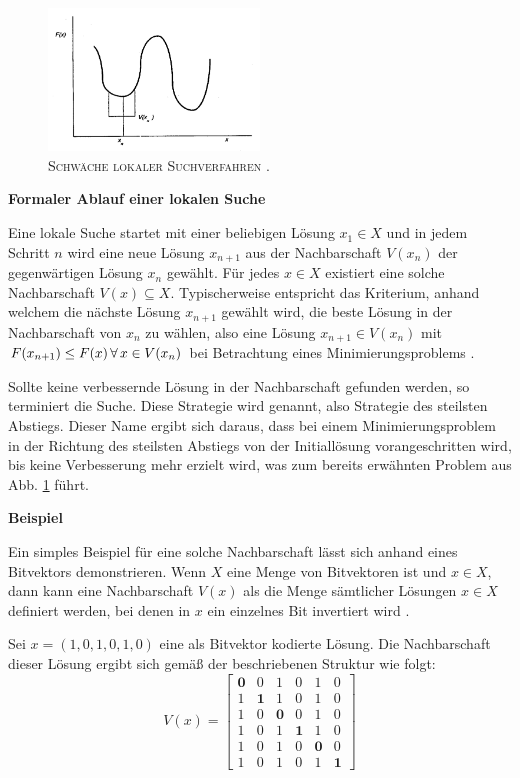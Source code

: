 \begin{figure}[H]
\centering
\includegraphics[width=0.5\textwidth]{img/local_minimum.png}
\caption{\textsc{Schwäche lokaler Suchverfahren \cite{Pirlot1996}.}}
\label{fig:local_search_weakness}
\end{figure}

\textbf{Formaler Ablauf einer lokalen Suche}

Eine lokale Suche startet mit einer beliebigen Lösung $x_1 \in X$ und in jedem Schritt $n$
wird eine neue Lösung $x_{n+1}$ aus der Nachbarschaft $V(x_n)$ der gegenwärtigen Lösung $x_n$ gewählt.
Für jedes $x \in X$ existiert eine solche Nachbarschaft $V(x) \subseteq X$.
Typischerweise entspricht das Kriterium, anhand welchem die nächste Lösung $x_{n+1}$ gewählt wird,
die beste Lösung in der Nachbarschaft von $x_n$ zu wählen, also eine Lösung $x_{n+1} \in V(x_n)$
mit $F(x_{n+1}) \leq F(x) \thinspace \forall \thinspace x \in V(x_n)$ bei Betrachtung eines
Minimierungsproblems \cite{Pirlot1996}.

Sollte keine verbessernde Lösung in der Nachbarschaft gefunden werden, so terminiert die Suche.
Diese Strategie wird  genannt, also Strategie des steilsten Abstiegs.
Dieser Name ergibt sich daraus, dass bei einem Minimierungsproblem in der Richtung des steilsten Abstiegs
von der Initiallösung vorangeschritten wird, bis keine Verbesserung mehr erzielt wird,
was zum bereits erwähnten Problem aus Abb. \ref{fig:local_search_weakness} führt.

\textbf{Beispiel}

Ein simples Beispiel für eine solche Nachbarschaft lässt sich anhand eines Bitvektors demonstrieren.
Wenn $X$ eine Menge von Bitvektoren ist und $x \in X$, dann kann eine Nachbarschaft $V(x)$ als die Menge
sämtlicher Lösungen $x \in X$ definiert werden, bei denen in $x$ ein einzelnes Bit invertiert wird \cite{Pirlot1996}.

Sei $x = (1, 0, 1, 0, 1, 0)$ eine als Bitvektor kodierte Lösung.
Die Nachbarschaft dieser Lösung ergibt sich gemäß der beschriebenen Struktur wie folgt:
\[
V(x) =
  \begin{bmatrix}
    \boldsymbol{0} & 0 & 1 & 0 & 1 & 0 \\
    1 & \boldsymbol{1} & 1 & 0 & 1 & 0 \\
    1 & 0 & \boldsymbol{0} & 0 & 1 & 0 \\
    1 & 0 & 1 & \boldsymbol{1} & 1 & 0 \\
    1 & 0 & 1 & 0 & \boldsymbol{0} & 0 \\
    1 & 0 & 1 & 0 & 1 & \boldsymbol{1}
  \end{bmatrix}
\]

